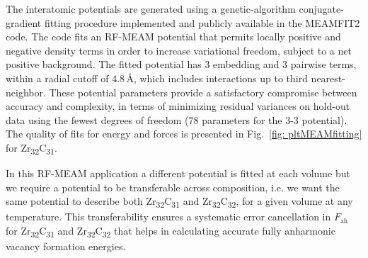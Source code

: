 \documentclass[twocolumn,american,aps,prb,showpacs,showkeys,amsmath,amssymb,superscriptaddress,a4]{revtex4-1}
\begin{document}
The interatomic potentials are generated using a genetic-algorithm conjugate-gradient
fitting procedure implemented and publicly available in the \textsc{\footnotesize{}MEAMFIT2}
code.\cite{Duff2015a,Duff2016,MEAMfitStatement} The code fits an
RF-MEAM potential that permits locally positive and negative density
terms in order to increase variational freedom, subject to a net positive background.
The fitted potential has 3 embedding and 3 pairwise terms, within
a radial cutoff of $4.8$\,\AA, which includes interactions up to third nearest-neighbor.
These potential parameters provide a satisfactory compromise between
accuracy and complexity, in terms of minimizing residual variances
on hold-out data using the fewest degrees of freedom (78 parameters
for the 3-3 potential). The quality of fits for energy and forces is presented
in Fig.~\ref{fig: pltMEAMfitting} for Zr\textsubscript{32}C\textsubscript{31}. 

In this RF-MEAM application a different potential is fitted at each
volume but we require a potential to be transferable  across composition, i.e. we want
the same potential to describe both Zr\textsubscript{32}C\textsubscript{31}
and Zr\textsubscript{32}C\textsubscript{32}, for a given volume at any temperature.
This  transferability ensures a systematic 
error cancellation in $F_{\text{ah}}$ for Zr\textsubscript{32}C\textsubscript{31}
and Zr\textsubscript{32}C\textsubscript{32} that helps in calculating accurate fully anharmonic vacancy formation energies. 
\end{document}
